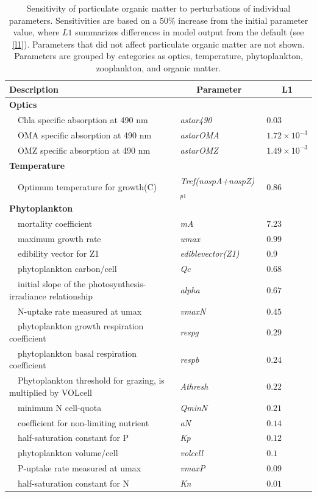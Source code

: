 \documentclass[letterpaper,12pt,oneside]{article}\usepackage[]{graphicx}\usepackage[]{color}
\begin{document}
\begin{table}[!tbp]
{\footnotesize
\caption{Sensitivity of particulate organic matter to perturbations of individual parameters.  Sensitivities are based on a 50\% increase from the initial parameter value, where $L1$ summarizes differences in model output from the default (see \cref{l1}).  Parameters that did not affect particulate organic matter are not shown.  Parameters are grouped by categories as optics, temperature, phytoplankton, zooplankton, and organic matter.\label{tab:om1sens}} 
\begin{center}
\begin{tabular}{lll}
\hline\hline
\multicolumn{1}{l}{Description}&\multicolumn{1}{c}{Parameter}&\multicolumn{1}{c}{L1}\tabularnewline
\hline
{\bfseries Optics}&&\tabularnewline
~~Chla specific absorption at 490 nm&\textit{astar490}&$0.03$\tabularnewline
~~OMA specific absorption at 490 nm&\textit{astarOMA}&$1.72\times 10^{-3}$\tabularnewline
~~OMZ specific absorption at 490 nm&\textit{astarOMZ}&$1.49\times 10^{-3}$\tabularnewline
\hline
{\bfseries Temperature}&&\tabularnewline
~~Optimum temperature for growth(C)&\textit{Tref(nospA+nospZ)$_{p1}$}&$0.86$\tabularnewline
\hline
{\bfseries Phytoplankton}&&\tabularnewline
~~mortality coefficient&\textit{mA}&$7.23$\tabularnewline
~~maximum growth rate&\textit{umax}&$0.99$\tabularnewline
~~edibility vector for Z1&\textit{ediblevector(Z1)}&$0.9$\tabularnewline
~~phytoplankton carbon/cell&\textit{Qc}&$0.68$\tabularnewline
~~initial slope of the photosynthesis-irradiance relationship&\textit{alpha}&$0.67$\tabularnewline
~~N-uptake rate measured at umax&\textit{vmaxN}&$0.45$\tabularnewline
~~phytoplankton growth respiration coefficient&\textit{respg}&$0.29$\tabularnewline
~~phytoplankton basal respiration coefficient&\textit{respb}&$0.24$\tabularnewline
~~Phytoplankton threshold for grazing, is multiplied by VOLcell&\textit{Athresh}&$0.22$\tabularnewline
~~minimum N cell-quota&\textit{QminN}&$0.21$\tabularnewline
~~coefficient for non-limiting nutrient&\textit{aN}&$0.14$\tabularnewline
~~half-saturation constant for P&\textit{Kp}&$0.12$\tabularnewline
~~phytoplankton volume/cell&\textit{volcell}&$0.1$\tabularnewline
~~P-uptake rate measured at umax&\textit{vmaxP}&$0.09$\tabularnewline
~~half-saturation constant for N&\textit{Kn}&$0.01$\tabularnewline

\end{tabular}
\end{center}}
\end{table}
\end{document}

